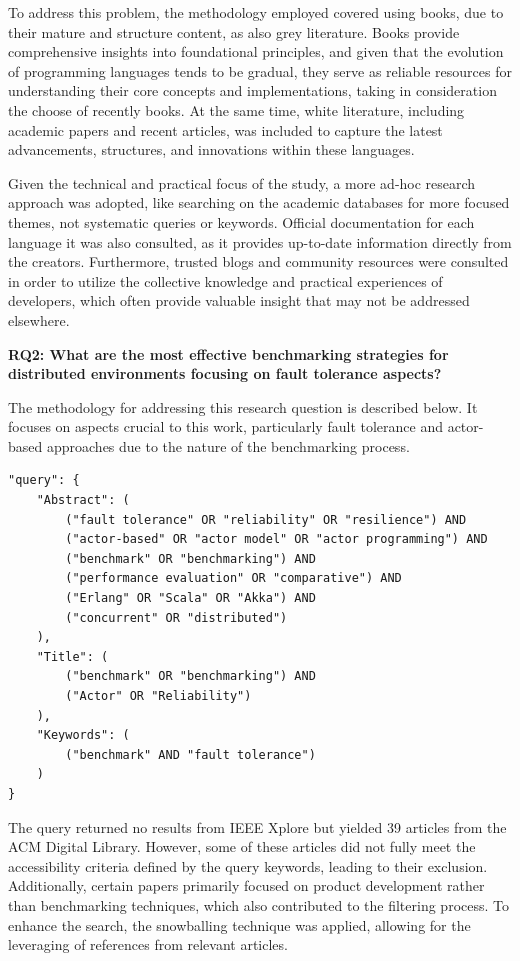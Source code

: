 To address this problem, the methodology employed covered using books, due to their mature and structure content, as also grey literature. Books provide comprehensive insights into foundational principles, and given that the evolution of programming languages tends to be gradual, they serve as reliable resources for understanding their core concepts and implementations, taking in consideration the choose of recently books. At the same time, white literature, including academic papers and recent articles, was included to capture the latest advancements, structures, and innovations within these languages.

Given the technical and practical focus of the study, a more ad-hoc research approach was adopted, like searching on the academic databases for more focused themes, not systematic queries or keywords. Official documentation for each language it was also consulted, as it provides up-to-date information directly from the creators. Furthermore, trusted blogs and community resources were consulted in order to utilize the collective knowledge and practical experiences of developers, which often provide valuable insight that may not be addressed elsewhere.

\textbf{RQ2: What are the most effective benchmarking strategies for distributed environments focusing on fault tolerance aspects?}

The methodology for addressing this research question is described below. It focuses on aspects crucial to this work, particularly fault tolerance and actor-based approaches due to the nature of the benchmarking process.

\begin{verbatim}
"query": {
    "Abstract": (
        ("fault tolerance" OR "reliability" OR "resilience") AND 
        ("actor-based" OR "actor model" OR "actor programming") AND 
        ("benchmark" OR "benchmarking") AND 
        ("performance evaluation" OR "comparative") AND 
        ("Erlang" OR "Scala" OR "Akka") AND 
        ("concurrent" OR "distributed")
    ),
    "Title": (
        ("benchmark" OR "benchmarking") AND 
        ("Actor" OR "Reliability")
    ),
    "Keywords": (
        ("benchmark" AND "fault tolerance")
    )
}
\end{verbatim}

The query returned no results from IEEE Xplore but yielded 39 articles from the ACM Digital Library. However, some of these articles did not fully meet the accessibility criteria defined by the query keywords, leading to their exclusion. Additionally, certain papers primarily focused on product development rather than benchmarking techniques, which also contributed to the filtering process. To enhance the search, the snowballing technique was applied, allowing for the leveraging of references from relevant articles.

